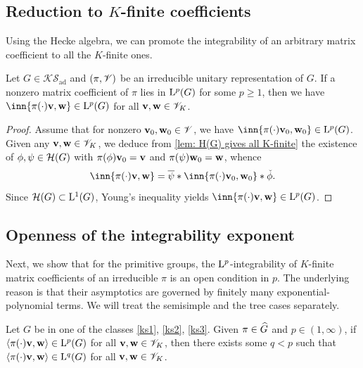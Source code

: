 \documentclass[a4paper, 10pt]{article}
\newcommand{\aks}{\mathcal{KS}_{\mathrm{ad}}}
\begin{document}
\subsection{Reduction to $K$-finite coefficients}
Using the Hecke algebra, we can promote the integrability of an arbitrary matrix coefficient to all the $K$-finite ones.
\begin{lemma}\label{lem: reduction to k-finite}
    Let $G\in\aks$ and $(\pi,\mathscr{V})$ be an irreducible unitary representation of $G$. If a nonzero matrix coefficient of $\pi$ lies in $\mathrm{L}^p(G)$ for some $p\geq 1$, then  we have $\inn{\pi(\cdot)\bfv,\bfw}\in\rmL^p(G)$ for all $\mathbf{v},\mathbf{w}\in\mathscr{V}_K$.
\end{lemma}
\begin{proof}
    Assume that for nonzero $\mathbf{v}_0,\mathbf{w}_0\in\mathscr{V}$, we have $\inn{\pi(\cdot)\bfv_0,\bfw_0}\in\rmL^p(G)$.
    Given any $\mathbf{v},\mathbf{w}\in\mathscr{V}_K$, we deduce from \autoref{lem: H(G) gives all K-finite} the existence of $\phi,\psi\in\mathcal{H}(G)$ with $\pi(\phi)\mathbf{v}_0=\mathbf{v}$ and $\pi(\psi)\mathbf{w}_0=\mathbf{w}$, whence
    \begin{equation*}
        \inn{\pi(\cdot)\bfv,\bfw} = \overline{\psi} * \inn{\pi(\cdot)\bfv_0, \bfw_0} * \check{\phi}.
    \end{equation*}
    Since $\mathcal{H}(G)\subset \mathrm{L}^1(G)$, Young's inequality yields $\inn{\pi(\cdot)\bfv,\bfw}\in\rmL^p(G)$.
\end{proof}


\subsection{Openness of the integrability exponent}
Next, we show that for the primitive groups, the $\mathrm{L}^p$-integrability of $K$-finite matrix coefficients of an irreducible $\pi$ is an open condition in $p$.
The underlying reason is that their asymptotics are governed by finitely many exponential-polynomial terms.
We will treat the semisimple and the tree cases separately.

\begin{lemma}\label{lem: open condition in p, Lp of K-finite coefficients}
    Let $G$ be in one of the classes \ref{ks1}, \ref{ks2}, \ref{ks3}. Given $\pi\in\widehat{G}$ and $p\in (1,\infty)$, if $\left\langle\pi(\cdot)\mathbf{v},\mathbf{w} \right\rangle\in \mathrm{L}^p(G)$ for all $\mathbf{v},\mathbf{w}\in \mathscr{V}_K$, then there exists some $q < p$ such that $\left\langle\pi(\cdot)\mathbf{v},\mathbf{w} \right\rangle\in \mathrm{L}^q(G)$ for all $\mathbf{v},\mathbf{w}\in \mathscr{V}_K$.
\end{lemma}
\end{document}
